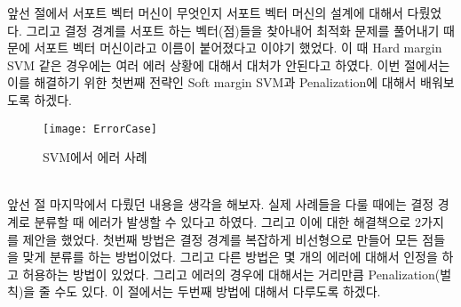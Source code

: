 \documentclass[a4paper]{oblivoir}
\begin{document}
\indent 앞선 절에서 서포트 벡터 머신이 무엇인지 서포트 벡터 머신의 설계에 대해서 다뤘었다. 그리고 결정 경계를 서포트 하는 벡터(점)들을 찾아내어 최적화 문제를 풀어내기 때문에 서포트 벡터 머신이라고 이름이 붙어졌다고 이야기 했었다. 이 때 Hard margin SVM 같은 경우에는 여러 에러 상황에 대해서 대처가 안된다고 하였다. 이번 절에서는 이를 해결하기 위한 첫번째 전략인 Soft margin SVM과 Penalization에 대해서 배워보도록 하겠다.\\
\begin{figure}[ht]\centering
\texttt{[image: ErrorCase]}\caption{SVM에서 에러 사례}\label{Fig:5-10}
\end{figure}\\
\indent 앞선 절 마지막에서 다뤘던 내용을 생각을 해보자. 실제 사례들을 다룰 때에는 결정 경계로 분류할 때 에러가 발생할 수 있다고 하였다. 그리고 이에 대한 해결책으로 2가지를 제안을 했었다. 첫번째 방법은 결정 경계를 복잡하게 비선형으로 만들어 모든 점들을 맞게 분류를 하는 방법이었다. 그리고 다른 방법은 몇 개의 에러에 대해서 인정을 하고 허용하는 방법이 있었다. 그리고 에러의 경우에 대해서는 거리만큼 Penalization(벌칙)을 줄 수도 있다. 이 절에서는 두번째 방법에 대해서 다루도록 하겠다.\\
\end{document}
